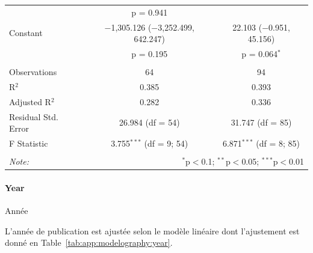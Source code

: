 \begin{table}
\begin{tabular}{@{\extracolsep{5pt}}lcc}
  & p = 0.941 &  \\ 
  Constant & $-$1,305.126 ($-$3,252.499, 642.247) & 22.103 ($-$0.951, 45.156) \\ 
  & p = 0.195 & p = 0.064$^{*}$ \\ 
 \hline \\[-1.8ex] 
Observations & 64 & 94 \\ 
R$^{2}$ & 0.385 & 0.393 \\ 
Adjusted R$^{2}$ & 0.282 & 0.336 \\ 
Residual Std. Error & 26.984 (df = 54) & 31.747 (df = 85) \\ 
F Statistic & 3.755$^{***}$ (df = 9; 54) & 6.871$^{***}$ (df = 8; 85) \\ 
\hline 
\hline \\[-1.8ex] 
\textit{Note:}  & \multicolumn{2}{r}{$^{*}$p$<$0.1; $^{**}$p$<$0.05; $^{***}$p$<$0.01} \\ 
\end{tabular} 
\end{table} 



\paragraph{Year}{Année}

L'année de publication est ajustée selon le modèle linéaire dont l'ajustement est donné en Table~\ref{tab:app:modelography:year}.


